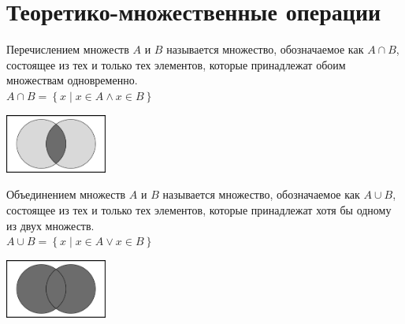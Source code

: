 \section{Теоретико-множественные операции}

\begin{definition}
    Перечислением множеств $A$ и $B$ называется множество, обозначаемое как $A \cap B$, состоящее из тех и только тех элементов, 
    которые принадлежат обоим множествам одновременно. \\ 

    $A \cap B = \left\{ x \mid x \in A \land x \in B \right\}$

    \begin{center}
        \includegraphics[width=0.25\textwidth]{tex/chapter_2/assets/Intersection.png}\\
    \end{center}
\end{definition}

\begin{definition}
    Объединением множеств $A$ и $B$ называется множество, обозначаемое как $A \cup B$, состоящее из тех и только тех элементов, 
    которые принадлежат хотя бы одному из двух множеств. \\ 

    $A \cup B = \left\{ x \mid x \in A \lor x \in B \right\}$

    \begin{center}
        \includegraphics[width=0.25\textwidth]{tex/chapter_2/assets/Union.png}\\
    \end{center}
\end{definition}

